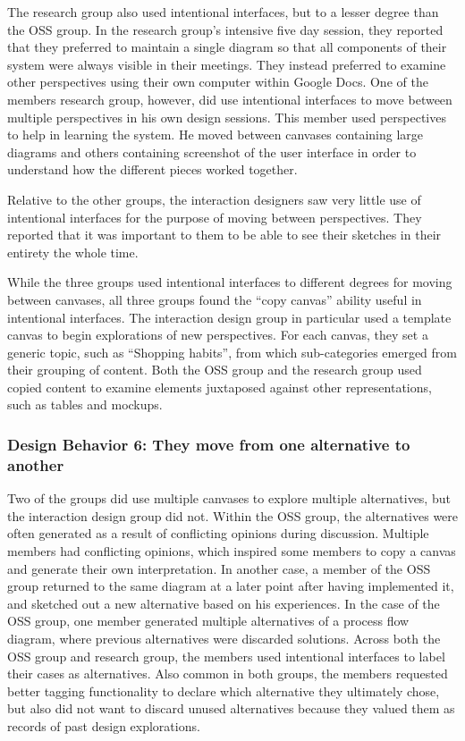 The research group also used intentional interfaces, but to a lesser degree than the OSS group. In the research group's intensive five day session, they reported that they preferred to maintain a single diagram so that all components of their system were always visible in their meetings. They instead preferred to examine other perspectives using their own computer within Google Docs. One of the members research group, however, did use intentional interfaces to move between multiple perspectives in his own design sessions. This member used perspectives to help in learning the system. He moved between canvases containing large diagrams and others containing screenshot of the user interface in order to understand how the different pieces worked together. 

Relative to the other groups, the interaction designers saw very little use of intentional interfaces for the purpose of moving between perspectives. They reported that it was important to them to be able to see their sketches in their entirety the whole time. 

While the three groups used intentional interfaces to different degrees for moving between canvases, all three groups found the ``copy canvas'' ability useful in intentional interfaces. The interaction design group in particular used a template canvas to begin explorations of new perspectives. For each canvas, they set a generic topic, such as ``Shopping habits'', from which sub-categories emerged from their grouping of content. Both the OSS group and the research group used copied content to examine elements juxtaposed against other representations, such as tables and mockups.


\subsubsection{Design Behavior 6: They move from one alternative to another}

Two of the groups did use multiple canvases to explore multiple alternatives, but the interaction design group did not. Within the OSS group, the alternatives were often generated as a result of conflicting opinions during discussion. Multiple members had conflicting opinions, which inspired some members to copy a canvas and generate their own interpretation. In another case, a member of the OSS group returned to the same diagram at a later point after having implemented it, and sketched out a new alternative based on his experiences. In the case of the OSS group, one member generated multiple alternatives of a process flow diagram, where previous alternatives were discarded solutions. Across both the OSS group and research group, the members used intentional interfaces to label their cases as alternatives. Also common in both groups, the members requested better tagging functionality to declare which alternative they ultimately chose, but also did not want to discard unused alternatives because they valued them as records of past design explorations.

